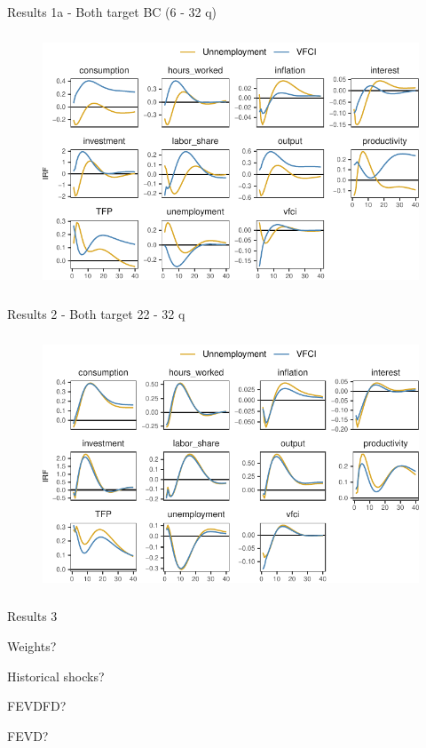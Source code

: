 \begin{frame}{Results 1a - Both target BC (6 - 32 q)}
    
    \label{results-1a}

    \begin{figure}
        \includegraphics[height = 3in]{figs/fig3_BCA_MBC.pdf}
    \end{figure}

\end{frame}



\begin{frame}{Results 2 - Both target 22 - 32 q}
    
    \label{results-2}

    \begin{figure}
        \includegraphics[height = 3in]{figs/fig5_vfci_u_same_freq.pdf}
    \end{figure}

\end{frame}


\begin{frame}{Results 3 }
    
    \label{results-3}

    Weights?

    Historical shocks?

    FEVDFD?

    FEVD?
    

\end{frame}
